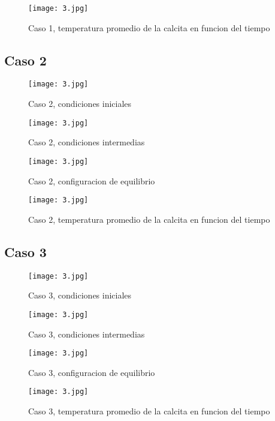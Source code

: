 \documentclass[reprint,amsmath,amssymb]{revtex4-1}
\begin{document}
\begin{figure}[h!]
    \centering
    \texttt{[image: 3.jpg]}
    \caption{Caso 1, temperatura promedio de la calcita en funcion del tiempo}
\end{figure}


\subsection{Caso 2}

\begin{figure}[h!]
    \centering
    \texttt{[image: 3.jpg]}
    \caption{Caso 2, condiciones iniciales}
\end{figure}

\begin{figure}[h!]
    \centering
    \texttt{[image: 3.jpg]}
    \caption{Caso 2, condiciones intermedias}
\end{figure}

\begin{figure}[h!]
    \centering
    \texttt{[image: 3.jpg]}
    \caption{Caso 2, configuracion de equilibrio}
\end{figure}

\begin{figure}[h!]
    \centering
    \texttt{[image: 3.jpg]}
    \caption{Caso 2, temperatura promedio de la calcita en funcion del tiempo}
\end{figure}

\subsection{Caso 3}


\begin{figure}[h!]
    \centering
    \texttt{[image: 3.jpg]}
    \caption{Caso 3, condiciones iniciales}
\end{figure}

\begin{figure}[h!]
    \centering
    \texttt{[image: 3.jpg]}
    \caption{Caso 3, condiciones intermedias}
\end{figure}

\begin{figure}[h!]
    \centering
    \texttt{[image: 3.jpg]}
    \caption{Caso 3, configuracion de equilibrio}
\end{figure}

\begin{figure}[h!]
    \centering
    \texttt{[image: 3.jpg]}
    \caption{Caso 3, temperatura promedio de la calcita en funcion del tiempo}
\end{figure}
\end{document}
